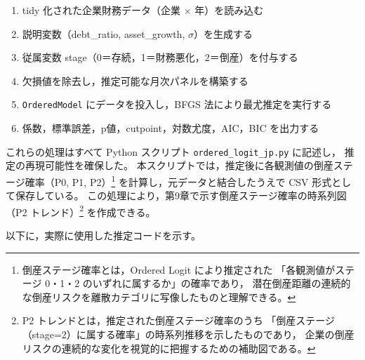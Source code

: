 \begin{enumerate}
    \item tidy 化された企業財務データ（企業 × 年）を読み込む  
    \item 説明変数（debt\_ratio, asset\_growth, $\sigma$）を生成する  
    \item 従属変数 stage（0＝存続，1＝財務悪化，2＝倒産）を付与する  
    \item 欠損値を除去し，推定可能な月次パネルを構築する  
    \item \texttt{OrderedModel} にデータを投入し，BFGS 法により最尤推定を実行する  
    \item 係数，標準誤差，p値，cutpoint，対数尤度，AIC，BIC を出力する  
\end{enumerate}

これらの処理はすべて Python スクリプト \texttt{ordered\_logit\_jp.py} に記述し，
推定の再現可能性を確保した。
本スクリプトでは，推定後に各観測値の倒産ステージ確率（P0, P1, P2）\footnote{
倒産ステージ確率とは，Ordered Logit により推定された
「各観測値がステージ 0・1・2 のいずれに属するか」の確率であり，
潜在倒産距離の連続的な倒産リスクを離散カテゴリに写像したものと理解できる。
}
を計算し，元データと結合したうえで CSV 形式として保存している。
この処理により，第9章で示す倒産ステージ確率の時系列図（P2 トレンド）\footnote{
P2 トレンドとは，推定された倒産ステージ確率のうち
「倒産ステージ（stage=2）に属する確率」の時系列推移を示したものであり，
企業の倒産リスクの連続的な変化を視覚的に把握するための補助図である。
}
を作成できる。


以下に，実際に使用した推定コードを示す。

